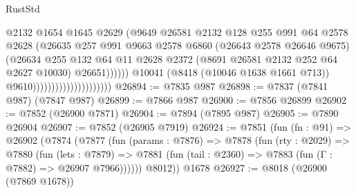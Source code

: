 \begin{lexlean}{RustStd}
\begin{coremodule}
                                                    @2132
                                                    @1654
                                                    @1645
                                                    @2629
                                                    (@9649
                                                      @26581
                                                      @2132
                                                      @128
                                                      @255
                                                      @991
                                                      @64
                                                      @2578
                                                      @2628
                                                      (@26635
                                                        @257
                                                        @991
                                                        @9663
                                                        @2578
                                                        @6860
                                                        (@26643 @2578 @26646 @9675)
                                                        (@26634
                                                          @255
                                                          @132
                                                          @64
                                                          @11
                                                          @2628
                                                          @2372
                                                          (@8691 @26581 @2132 @252 @64 @2627 @10030)
                                                          @26651))))))
                                              @10041
                                              (@8418 (@10046 @1638 @1661 @713))
                                              @9610)))))))))))))))))))))
@26894 := @7835 @987
@26898 := @7837 (@7841 @987) (@7847 @987)
@26899 := @7866 @987
@26900 := @7856 @26899
@26902 := @7852 (@26900 @7871)
@26904 := @7894 (@7895 @987)
@26905 := @7890 @26904
@26907 := @7852 (@26905 @7919)
@26924 := @7851
    (fun (fn : @91) =>
    @26902
      (@7874
        (@7877
          (fun (params : @7876) =>
          @7878
            (fun (rty : @2029) =>
            @7880
              (fun (lets : @7879) =>
              @7881 (fun (tail : @2360) => @7883 (fun (Γ : @7882) => @26907 @7966))))))
        @8012))
    @1678
@26927 := @8018 (@26900 (@7869 @1678))

\end{coremodule}
\end{lexlean}

